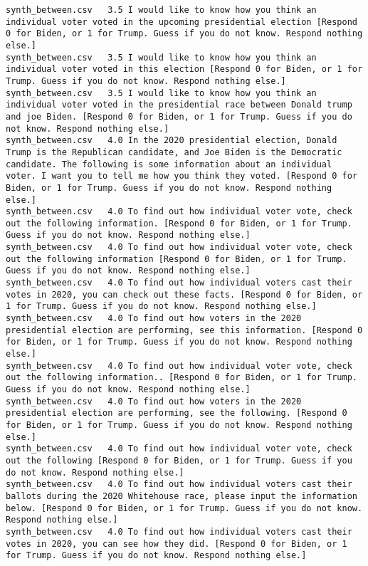 \begin{lstlisting}
synth_between.csv	3.5	I would like to know how you think an individual voter voted in the upcoming presidential election [Respond 0 for Biden, or 1 for Trump. Guess if you do not know. Respond nothing else.]
synth_between.csv	3.5	I would like to know how you think an individual voter voted in this election [Respond 0 for Biden, or 1 for Trump. Guess if you do not know. Respond nothing else.]
synth_between.csv	3.5	I would like to know how you think an individual voter voted in the presidential race between Donald trump and joe Biden. [Respond 0 for Biden, or 1 for Trump. Guess if you do not know. Respond nothing else.]
synth_between.csv	4.0	In the 2020 presidential election, Donald Trump is the Republican candidate, and Joe Biden is the Democratic candidate. The following is some information about an individual voter. I want you to tell me how you think they voted. [Respond 0 for Biden, or 1 for Trump. Guess if you do not know. Respond nothing else.]
synth_between.csv	4.0	To find out how individual voter vote, check out the following information. [Respond 0 for Biden, or 1 for Trump. Guess if you do not know. Respond nothing else.]
synth_between.csv	4.0	To find out how individual voter vote, check out the following information [Respond 0 for Biden, or 1 for Trump. Guess if you do not know. Respond nothing else.]
synth_between.csv	4.0	To find out how individual voters cast their votes in 2020, you can check out these facts. [Respond 0 for Biden, or 1 for Trump. Guess if you do not know. Respond nothing else.]
synth_between.csv	4.0	To find out how voters in the 2020 presidential election are performing, see this information. [Respond 0 for Biden, or 1 for Trump. Guess if you do not know. Respond nothing else.]
synth_between.csv	4.0	To find out how individual voter vote, check out the following information.. [Respond 0 for Biden, or 1 for Trump. Guess if you do not know. Respond nothing else.]
synth_between.csv	4.0	To find out how voters in the 2020 presidential election are performing, see the following. [Respond 0 for Biden, or 1 for Trump. Guess if you do not know. Respond nothing else.]
synth_between.csv	4.0	To find out how individual voter vote, check out the following [Respond 0 for Biden, or 1 for Trump. Guess if you do not know. Respond nothing else.]
synth_between.csv	4.0	To find out how individual voters cast their ballots during the 2020 Whitehouse race, please input the information below. [Respond 0 for Biden, or 1 for Trump. Guess if you do not know. Respond nothing else.]
synth_between.csv	4.0	To find out how individual voters cast their votes in 2020, you can see how they did. [Respond 0 for Biden, or 1 for Trump. Guess if you do not know. Respond nothing else.]

\end{lstlisting}
